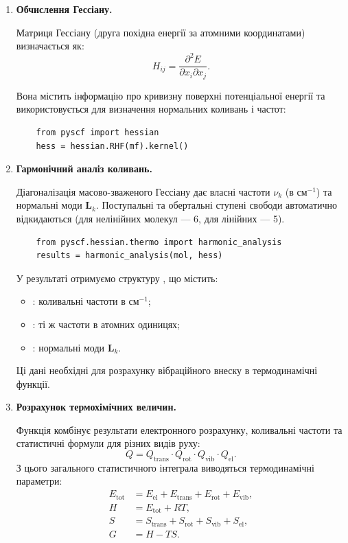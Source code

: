 \begin{enumerate}

    \item \textbf{Обчислення Гессіану.}

    Матриця Гессіану (друга похідна енергії за атомними координатами) визначається як:
    \[
        H_{ij} = \frac{\partial^2 E}{\partial x_i \partial x_j}.
    \]

    Вона містить інформацію про кривизну поверхні потенціальної енергії та використовується для визначення нормальних коливань і частот:
    \begin{verbatim}
    from pyscf import hessian
    hess = hessian.RHF(mf).kernel()
    \end{verbatim}

    \item \textbf{Гармонічний аналіз коливань.}

    Діагоналізація масово-зваженого Гессіану дає власні частоти $\nu_k$ (в см${}^{-1}$) та нормальні моди $\mathbf{L}_k$.
    Поступальні та обертальні ступені свободи автоматично відкидаються (для нелінійних молекул --- 6, для лінійних --- 5).

    \begin{verbatim}
    from pyscf.hessian.thermo import harmonic_analysis
    results = harmonic_analysis(mol, hess)
    \end{verbatim}

    У результаті отримуємо структуру , що містить:
    \begin{itemize}
        \item {}: коливальні частоти в см$^{-1}$;
        \item {}: ті ж частоти в атомних одиницях;
        \item {}: нормальні моди $\mathbf{L}_k$.
    \end{itemize}

    Ці дані необхідні для розрахунку вібраційного внеску в термодинамічні функції.

    \item \textbf{Розрахунок термохімічних величин.}

    Функція  комбінує результати електронного розрахунку, коливальні частоти та статистичні формули для різних видів руху:
    \begin{equation}
        Q = Q_\text{trans} \cdot Q_\text{rot} \cdot Q_\text{vib} \cdot Q_\text{el}.
    \end{equation}
    З цього загального статистичного інтеграла виводяться термодинамічні параметри:
    \begin{align}
        E_\text{tot} &= E_\text{el} + E_\text{trans} + E_\text{rot} + E_\text{vib},\\
        H &= E_\text{tot} + RT, \\
        S &= S_\text{trans} + S_\text{rot} + S_\text{vib} + S_\text{el},\\
        G &= H - TS.
    \end{align}


\end{enumerate}
